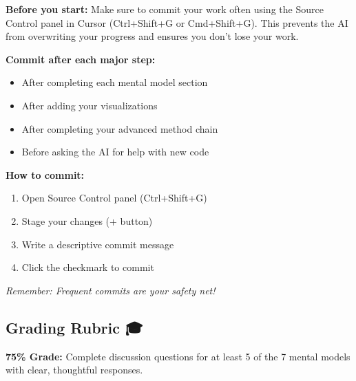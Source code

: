 \documentclass[
  letterpaper,
  DIV=11,
  numbers=noendperiod]{scrartcl}
\providecommand{\tightlist}{%
  \setlength{\itemsep}{0pt}\setlength{\parskip}{0pt}}
\begin{document}
\begin{tcolorbox}[enhanced jigsaw, bottomtitle=1mm, opacitybacktitle=0.6, toptitle=1mm, colbacktitle=quarto-callout-warning-color!10!white, breakable, coltitle=black, bottomrule=.15mm, left=2mm, colframe=quarto-callout-warning-color-frame, colback=white, title=\textcolor{quarto-callout-warning-color}{\faExclamationTriangle}\hspace{0.5em}{💾 Important: Save Your Work Frequently!}, leftrule=.75mm, arc=.35mm, rightrule=.15mm, opacityback=0, toprule=.15mm, titlerule=0mm]

\textbf{Before you start:} Make sure to commit your work often using the
Source Control panel in Cursor (Ctrl+Shift+G or Cmd+Shift+G). This
prevents the AI from overwriting your progress and ensures you don't
lose your work.

\textbf{Commit after each major step:}

\begin{itemize}
\tightlist
\item
  After completing each mental model section
\item
  After adding your visualizations
\item
  After completing your advanced method chain
\item
  Before asking the AI for help with new code
\end{itemize}

\textbf{How to commit:}

\begin{enumerate}
\def\labelenumi{\arabic{enumi}.}
\tightlist
\item
  Open Source Control panel (Ctrl+Shift+G)
\item
  Stage your changes (+ button)
\item
  Write a descriptive commit message
\item
  Click the checkmark to commit
\end{enumerate}

\emph{Remember: Frequent commits are your safety net!}

\end{tcolorbox}

\subsection{Grading Rubric 🎓}\label{grading-rubric}

\textbf{75\% Grade:} Complete discussion questions for at least 5 of the
7 mental models with clear, thoughtful responses.
\end{document}
